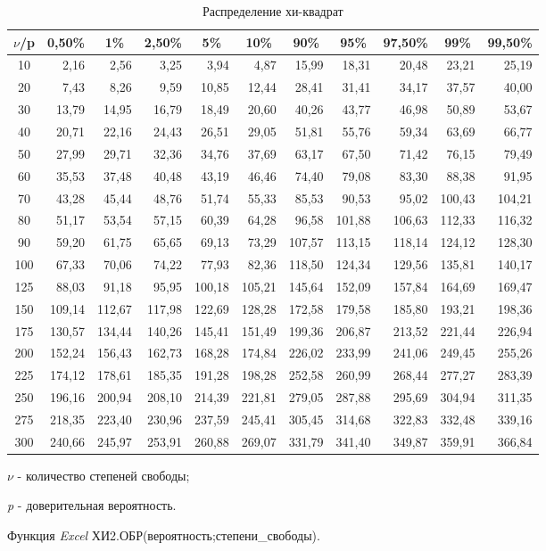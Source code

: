 \documentclass[12pt,a4paper]{article}
\begin{document}
\begin{table}[htbp]
  \centering
  \caption{Распределение хи-квадрат}
    \begin{tabular}{crrrrrrrrrr}
    \toprule
    $\nu$/p  & \multicolumn{1}{c}{0,50\%} & \multicolumn{1}{c}{1\%} & \multicolumn{1}{c}{2,50\%} & \multicolumn{1}{c}{5\%} & \multicolumn{1}{c}{10\%} & \multicolumn{1}{c}{90\%} & \multicolumn{1}{c}{95\%} & \multicolumn{1}{c}{97,50\%} & \multicolumn{1}{c}{99\%} & \multicolumn{1}{c}{99,50\%} \\
    \midrule
    10    & 2,16  & 2,56  & 3,25  & 3,94  & 4,87  & 15,99 & 18,31 & 20,48 & 23,21 & 25,19 \\
    20    & 7,43  & 8,26  & 9,59  & 10,85 & 12,44 & 28,41 & 31,41 & 34,17 & 37,57 & 40,00 \\
    30    & 13,79 & 14,95 & 16,79 & 18,49 & 20,60 & 40,26 & 43,77 & 46,98 & 50,89 & 53,67 \\
    40    & 20,71 & 22,16 & 24,43 & 26,51 & 29,05 & 51,81 & 55,76 & 59,34 & 63,69 & 66,77 \\
    50    & 27,99 & 29,71 & 32,36 & 34,76 & 37,69 & 63,17 & 67,50 & 71,42 & 76,15 & 79,49 \\
    60    & 35,53 & 37,48 & 40,48 & 43,19 & 46,46 & 74,40 & 79,08 & 83,30 & 88,38 & 91,95 \\
    70    & 43,28 & 45,44 & 48,76 & 51,74 & 55,33 & 85,53 & 90,53 & 95,02 & 100,43 & 104,21 \\
    80    & 51,17 & 53,54 & 57,15 & 60,39 & 64,28 & 96,58 & 101,88 & 106,63 & 112,33 & 116,32 \\
    90    & 59,20 & 61,75 & 65,65 & 69,13 & 73,29 & 107,57 & 113,15 & 118,14 & 124,12 & 128,30 \\
    100   & 67,33 & 70,06 & 74,22 & 77,93 & 82,36 & 118,50 & 124,34 & 129,56 & 135,81 & 140,17 \\
    125   & 88,03 & 91,18 & 95,95 & 100,18 & 105,21 & 145,64 & 152,09 & 157,84 & 164,69 & 169,47 \\
    150   & 109,14 & 112,67 & 117,98 & 122,69 & 128,28 & 172,58 & 179,58 & 185,80 & 193,21 & 198,36 \\
    175   & 130,57 & 134,44 & 140,26 & 145,41 & 151,49 & 199,36 & 206,87 & 213,52 & 221,44 & 226,94 \\
    200   & 152,24 & 156,43 & 162,73 & 168,28 & 174,84 & 226,02 & 233,99 & 241,06 & 249,45 & 255,26 \\
    225   & 174,12 & 178,61 & 185,35 & 191,28 & 198,28 & 252,58 & 260,99 & 268,44 & 277,27 & 283,39 \\
    250   & 196,16 & 200,94 & 208,10 & 214,39 & 221,81 & 279,05 & 287,88 & 295,69 & 304,94 & 311,35 \\
    275   & 218,35 & 223,40 & 230,96 & 237,59 & 245,41 & 305,45 & 314,68 & 322,83 & 332,48 & 339,16 \\
    300   & 240,66 & 245,97 & 253,91 & 260,88 & 269,07 & 331,79 & 341,40 & 349,87 & 359,91 & 366,84 \\
    \bottomrule
    \end{tabular}%
  \label{tab:addlabel}%
\end{table}%

\textit{$\nu$} - количество степеней свободы;

\textit{p} - доверительная вероятность.

Функция \textit{Excel} ХИ2.ОБР(вероятность;степени\_свободы).
\end{document}
